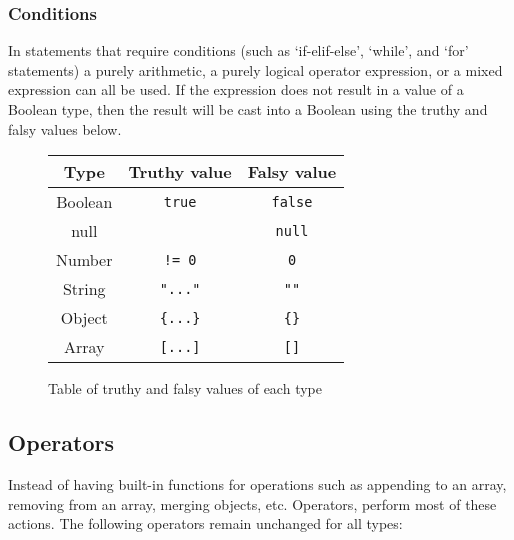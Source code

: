 \subsubsection{Conditions}

In statements that require conditions (such as `if-elif-else', `while', and `for' statements) a purely arithmetic, a purely logical operator expression, or a mixed expression can all be used. If the expression does not result in a value of a Boolean type, then the result will be cast into a Boolean using the truthy and falsy values below.

\begin{figure}[H]
    \begin{center}
        \begin{tabular}{| c | c | c |}
            \hline
            Type & Truthy value & Falsy value\\
            \hline
            Boolean & \verb|true| & \verb|false|\\
            \hline
            null & & \verb|null|\\
            \hline
            Number & \verb|!= 0| & \verb|0|\\
            \hline
            String & \verb|"..."| & \verb|""|\\
            \hline
            Object & \verb|{...}| & \verb|{}|\\
            \hline
            Array & \verb|[...]| & \verb|[]|\\
            \hline
        \end{tabular}
    \end{center}
    \caption{Table of truthy and falsy values of each type}
\end{figure}

\subsection{Operators}
\label{sec:operatorvaluerel}

Instead of having built-in functions for operations such as appending to an array, removing from an array, merging objects, etc. Operators, perform most of these actions. The following operators remain unchanged for all types:

